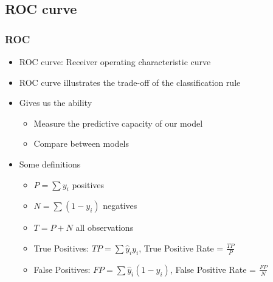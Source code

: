 \documentclass[
  shownotes,
  xcolor={svgnames},
  hyperref={colorlinks,citecolor=DarkBlue,linkcolor=DarkRed,urlcolor=DarkBlue}
  , aspectratio=169]{beamer}
\begin{document}
\subsection{ROC curve}
\begin{frame}[fragile]
\frametitle{ROC}


\begin{itemize}
\item ROC curve: Receiver operating characteristic curve
\medskip
\item ROC curve illustrates the trade-off of the classification rule
\medskip
\item Gives us the ability
\begin{itemize}
  \item Measure the predictive capacity of our model
  \medskip
  \item Compare between models
  \medskip
\end{itemize}
  \item Some definitions
  \begin{itemize}
    \item $P=\sum y_i$ positives
    \medskip
    \item $N=\sum(1-y_i)$ negatives
    \medskip
    \item $T=P+N$ all observations
    \medskip
    \item True Positives: $TP=\sum \hat{y}_i y_i$, True Positive Rate = $\frac{TP}{P}$
    \medskip
    \item False Positives: $FP=\sum \hat{y}_i (1-y_i)$, False Positive Rate = $\frac{FP}{N}$

  \end{itemize}
\end{itemize}


\end{frame}
\end{document}
